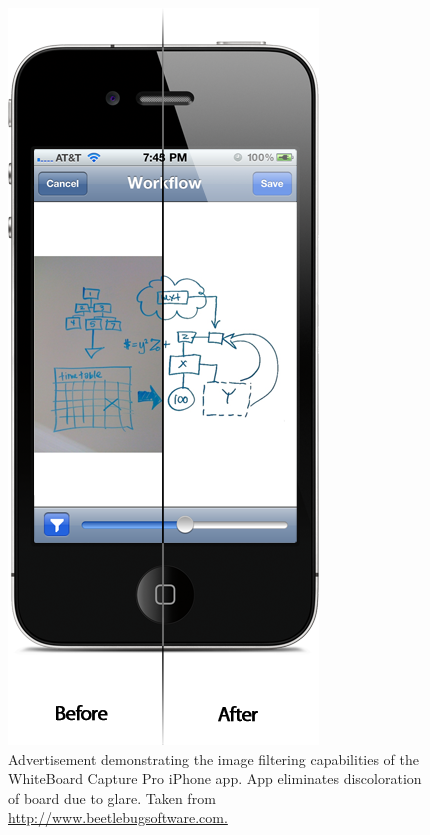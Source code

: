 \documentclass{article}
\begin{document}
			
			\begin{figure}
	      			\centering
	      			\includegraphics[scale=0.3]{./images/wbcp-example-ad.png}
				\caption{Advertisement demonstrating the image filtering capabilities of the WhiteBoard Capture Pro iPhone app. App eliminates discoloration of board due to glare. Taken from \url{http://www.beetlebugsoftware.com.}}
				\label{fig:wbcp-example-ad}
	   		 \end{figure}
			
\end{document}
